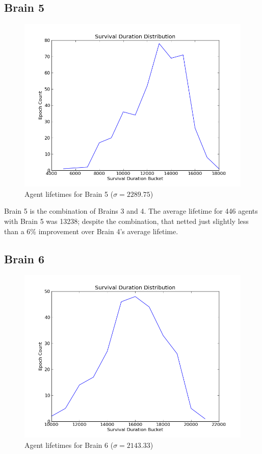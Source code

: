 \subsection{Brain 5}

\begin{figure}
\begin{center}
  \includegraphics[scale=.65]{plots/brain5hist.png}
  \caption{Agent lifetimes for Brain 5 ($\sigma = 2289.75$)}
  \label{fig:brain5his}
\end{center}
\end{figure}

Brain 5 is the combination of Brains 3 and 4. The average lifetime for 446
agents with Brain 5 was 13238; despite the combination, that netted just 
slightly less than a 6\% improvement over Brain 4's average lifetime. 


\subsection{Brain 6}
\begin{figure}
\begin{center}
  \includegraphics[scale=.65]{plots/brain6hist.png}
  \caption{Agent lifetimes for Brain 6 ($\sigma = 2143.33$)}
  \label{fig:brain6his}
\end{center}
\end{figure}

